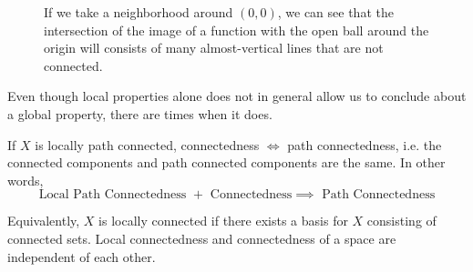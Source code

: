 \begin{example}
\begin{figure}[H]
      \caption{If we take a neighborhood around $(0, 0)$, we can see that the intersection of the image of a function with the open ball around the origin will consists of many almost-vertical lines that are not connected.} 
      \label{fig:top_sine_curve_2}
    \end{figure}
  \end{example}

  Even though local properties alone does not in general allow us to conclude about a global property, there are times when it does. 

  \begin{theorem}
    If $X$ is locally path connected, connectedness $\iff$ path connectedness, i.e. the connected components and path connected components are the same. In other words, 
    \begin{equation}
      \text{Local Path Connectedness } + \text{ Connectedness} \implies \text{ Path Connectedness}
    \end{equation}
  \end{theorem} 

  Equivalently, $X$ is locally connected if there exists a basis for $X$ consisting of connected sets. Local connectedness and connectedness of a space are independent of each other. 

